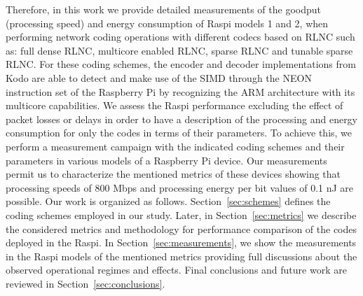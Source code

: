 Therefore, in this work we provide detailed measurements of the goodput (processing
speed) and energy consumption of \ac{Raspi} models 1 and 2, when
performing network coding operations with different codecs based on \ac{RLNC}
such as: full dense \ac{RLNC}, multicore enabled \ac{RLNC}, sparse \ac{RLNC}
and tunable sparse \ac{RLNC}. For these coding schemes, the encoder and decoder
implementations from Kodo are able to detect and make use of the \ac{SIMD}
through the NEON instruction set of the Raspberry Pi by recognizing the \ac{ARM}
architecture with its multicore capabilities. We assess
the \ac{Raspi} performance excluding the effect of packet losses or delays in
order to have a description of the processing and energy consumption for only the
codes in terms of their parameters. To achieve this, we perform a measurement
campaign with the indicated coding schemes and their parameters in various models
of a Raspberry Pi device. Our measurements permit us to characterize the mentioned
metrics of these devices showing that processing speeds of 800 Mbps and processing
energy per bit values of 0.1 nJ are possible. Our work is organized as follows.
Section~\ref{sec:schemes} defines the
coding schemes employed in our study. Later, in Section~\ref{sec:metrics}
we describe the considered metrics and methodology for performance comparison
of the codes deployed in the \ac{Raspi}. In Section~\ref{sec:measurements}, we
show the measurements in the \ac{Raspi} models of the mentioned metrics
providing full discussions about the observed operational regimes and effects.
Final conclusions and future work are reviewed in
Section~\ref{sec:conclusions}.

